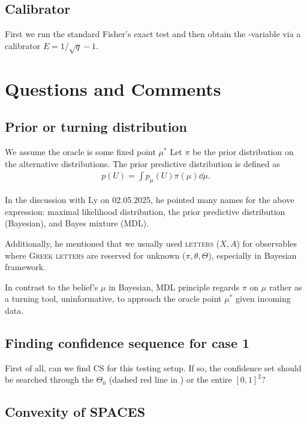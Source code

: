 \subsection{Calibrator}

First we run the standard Fisher's exact test and then obtain the \E-variable via
a calibrator $E = 1/\sqrt{q} - 1$.

\clearpage

\section{Questions and Comments}

\subsection{Prior or turning distribution}

We assume the oracle is some fixed point $\mu^*$
Let $\pi$ be the prior distribution on the alternative distributions.
The prior predictive distribution is defined as
\begin{align*}
	p(U) = \int p_{\mu}(U) \pi(\mu) \dd{\mu}.
\end{align*}

In the discussion with Ly on 02.05.2025, he pointed many names for
the above expression:
maximal likelihood distribution, the prior predictive distribution (Bayesian), and Bayes mixture (MDL).

Additionally, he mentioned that we usually used \textsc{letters} ($X,A$) for
observables where \textsc{Greek letters} are reserved for unknown
($\pi, \theta, \Theta$), especially in Bayesian framework.

In contrast to the belief's $\mu$ in Bayesian, MDL principle
regards $\pi$ on $\mu$ rather as a turning tool, uninformative,
to approach the oracle point $\mu^*$ given incoming data.

\subsection{Finding confidence sequence for case 1}
First of all, can we find CS for this testing setup.
If so, the confidence set should be searched through the $\Theta_0$
(dashed red line in ) or the entire $[0,1]^2$?

\subsection{Convexity of \textsc{SPACES}}

